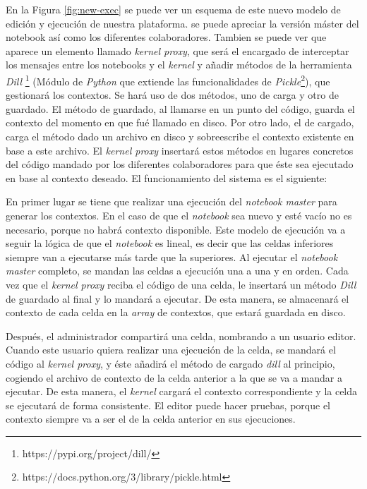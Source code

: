 \documentclass[11pt,spanish,listoffigures]{tfgetsinf}
\begin{document}
En la Figura \ref{fig:new-exec} se puede ver un esquema de este nuevo modelo de edición y ejecución de nuestra plataforma. se puede apreciar la versión máster del notebook así como los diferentes colaboradores. Tambien se puede ver que aparece un elemento llamado \textit{kernel proxy}, que será el encargado de interceptar los mensajes entre los notebooks y el \textit{kernel} y añadir métodos de la herramienta \textit{Dill} \footnote{https://pypi.org/project/dill/} (Módulo de \textit{Python} que extiende las funcionalidades de \textit{Pickle}\footnote{https://docs.python.org/3/library/pickle.html}), que gestionará los contextos. Se hará uso de dos métodos, uno de carga y otro de guardado. El método de guardado, al llamarse en un punto del código, guarda el contexto del momento en que fué llamado en disco. Por otro lado, el de cargado, carga el método dado un archivo en disco y sobreescribe el contexto existente en base a este archivo. El \textit{kernel proxy} insertará estos métodos en lugares concretos del código mandado por los diferentes colaboradores para que éste sea ejecutado en base al contexto deseado. El funcionamiento del sistema es el siguiente:

En primer lugar se tiene que realizar una ejecución del \textit{notebook master} para generar los contextos. En el caso de que el \textit{notebook} sea nuevo y esté vacío no es necesario, porque no habrá contexto disponible. Este modelo de ejecución va a seguir la lógica de que el \textit{notebook} es lineal, es decir que las celdas inferiores siempre van a ejecutarse más tarde que la superiores. Al ejecutar el \textit{notebook master} completo, se mandan las celdas a ejecución una a una y en orden. Cada vez que el \textit{kernel proxy} reciba el código de una celda, le insertará un método \textit{Dill} de guardado al final y lo mandará a ejecutar. De esta manera, se almacenará el contexto de cada celda en la \textit{array} de contextos, que estará guardada en disco. 

Después, el administrador compartirá una celda, nombrando a un usuario editor. Cuando este usuario quiera realizar una ejecución de la celda, se mandará el código al \textit{kernel proxy}, y éste añadirá el método de cargado \textit{dill} al principio, cogiendo el archivo de contexto de la celda anterior a la que se va a mandar a ejecutar. De esta manera, el \textit{kernel} cargará el contexto correspondiente y la celda se ejecutará de forma consistente. El editor puede hacer pruebas, porque el contexto siempre va a ser el de la celda anterior en sus ejecuciones.
\end{document}
